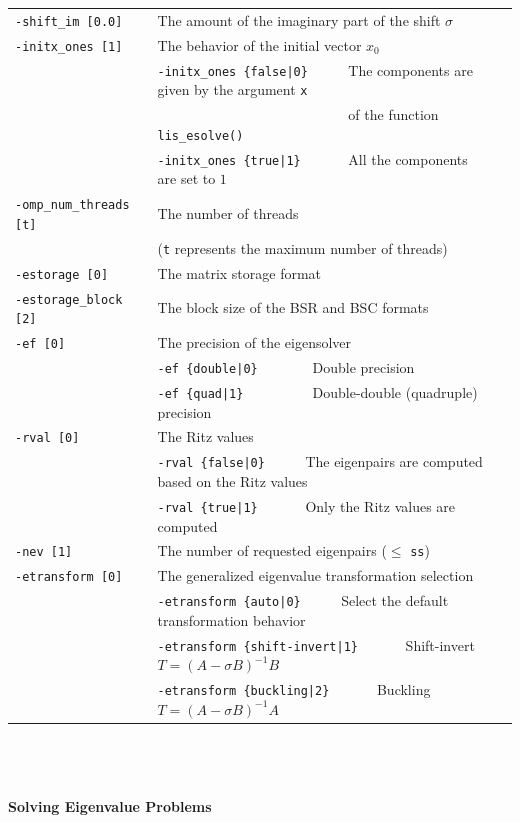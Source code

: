 \documentclass[a4paper]{article}
\begin{document}
\begin{minipage}[t]{\textwidth}
\begin{center}
\begin{tabular}{l|ll}
\verb=-shift_im [0.0]= & The amount of the imaginary part of the shift $\sigma$ \\
\verb=-initx_ones [1]= & The behavior of the initial vector $x_{0}$  \\
                       & \verb=-initx_ones {false|0}     =  The components are given by the argument \verb=x= \\
                       & \verb=                          =  of the function \verb=lis_esolve()= \\
                       & \verb=-initx_ones {true|1}      =  All the components are set to $1$ \\
\verb=-omp_num_threads [t]= & The number of threads        \\ 
                            & (\verb=t= represents the maximum number of
 threads) \\
\verb=-estorage [0]=   & The matrix storage format \\
\verb=-estorage_block [2]=& The block size of the BSR and BSC formats\\ 
\verb=-ef [0]=         & The precision of the eigensolver\\
                       & \verb=-ef {double|0}       =  Double precision \\ 
                       & \verb=-ef {quad|1}         =  Double-double (quadruple) precision \\
\verb=-rval [0]=       & The Ritz values \\
                       & \verb=-rval {false|0}     =  The eigenpairs are computed based on the Ritz values \\
                       & \verb=-rval {true|1}      =  Only the Ritz values are computed \\
\verb=-nev [1]=        & The number of requested eigenpairs ($\le$ \verb=ss=) \\
\verb=-etransform [0]=       & The generalized eigenvalue transformation selection \\
                       & \verb=-etransform {auto|0}     =  Select the default transformation behavior \\
                       & \verb=-etransform {shift-invert|1}      =  Shift-invert $T = (A - \sigma B)^{-1}B$ \\
                       & \verb=-etransform {buckling|2}      =  Buckling $T = (A - \sigma B)^{-1}A$ \\
\hline         
\end{tabular}
\end{center}
\end{minipage}
\\ \\ \\
\noindent
{\bf Solving Eigenvalue Problems}
\end{document}
